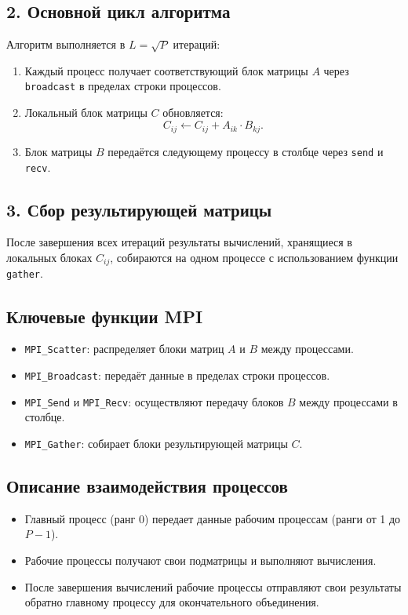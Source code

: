 \documentclass{report}
\begin{document}
\subsection*{2. Основной цикл алгоритма}
Алгоритм выполняется в $L = \sqrt{P}$ итераций:
\begin{enumerate}
	\item Каждый процесс получает соответствующий блок матрицы $A$ через \texttt{broadcast} в пределах строки процессов.
	\item Локальный блок матрицы $C$ обновляется:
	\[
	C_{ij} \xleftarrow{} C_{ij} + A_{ik} \cdot B_{kj}.
	\]
	\item Блок матрицы $B$ передаётся следующему процессу в столбце через \texttt{send} и \texttt{recv}.
\end{enumerate}

\subsection*{3. Сбор результирующей матрицы}
После завершения всех итераций результаты вычислений, хранящиеся в локальных блоках $C_{ij}$, собираются на одном процессе с использованием функции \texttt{gather}.

\subsection*{Ключевые функции MPI}
\begin{itemize}
	\item \texttt{MPI\_Scatter}: распределяет блоки матриц $A$ и $B$ между процессами.
	\item \texttt{MPI\_Broadcast}: передаёт данные в пределах строки процессов.
	\item \texttt{MPI\_Send} и \texttt{MPI\_Recv}: осуществляют передачу блоков $B$ между процессами в столбце.
	\item \texttt{MPI\_Gather}: собирает блоки результирующей матрицы $C$.
\end{itemize}
\subsection*{Описание взаимодействия процессов}
\begin{itemize}
	\item Главный процесс (ранг 0) передает данные рабочим процессам (ранги от 1 до \( P-1 \)).
	\item Рабочие процессы получают свои подматрицы и выполняют вычисления.
	\item После завершения вычислений рабочие процессы отправляют свои результаты обратно главному процессу для окончательного объединения.
\end{itemize}
\end{document}

